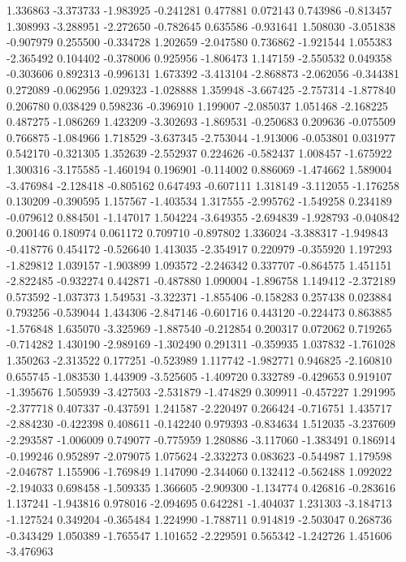 1.336863
-3.373733
-1.983925
-0.241281
0.477881
0.072143
0.743986
-0.813457
1.308993
-3.288951
-2.272650
-0.782645
0.635586
-0.931641
1.508030
-3.051838
-0.907979
0.255500
-0.334728
1.202659
-2.047580
0.736862
-1.921544
1.055383
-2.365492
0.104402
-0.378006
0.925956
-1.806473
1.147159
-2.550532
0.049358
-0.303606
0.892313
-0.996131
1.673392
-3.413104
-2.868873
-2.062056
-0.344381
0.272089
-0.062956
1.029323
-1.028888
1.359948
-3.667425
-2.757314
-1.877840
0.206780
0.038429
0.598236
-0.396910
1.199007
-2.085037
1.051468
-2.168225
0.487275
-1.086269
1.423209
-3.302693
-1.869531
-0.250683
0.209636
-0.075509
0.766875
-1.084966
1.718529
-3.637345
-2.753044
-1.913006
-0.053801
0.031977
0.542170
-0.321305
1.352639
-2.552937
0.224626
-0.582437
1.008457
-1.675922
1.300316
-3.175585
-1.460194
0.196901
-0.114002
0.886069
-1.474662
1.589004
-3.476984
-2.128418
-0.805162
0.647493
-0.607111
1.318149
-3.112055
-1.176258
0.130209
-0.390595
1.157567
-1.403534
1.317555
-2.995762
-1.549258
0.234189
-0.079612
0.884501
-1.147017
1.504224
-3.649355
-2.694839
-1.928793
-0.040842
0.200146
0.180974
0.061172
0.709710
-0.897802
1.336024
-3.388317
-1.949843
-0.418776
0.454172
-0.526640
1.413035
-2.354917
0.220979
-0.355920
1.197293
-1.829812
1.039157
-1.903899
1.093572
-2.246342
0.337707
-0.864575
1.451151
-2.822485
-0.932274
0.442871
-0.487880
1.090004
-1.896758
1.149412
-2.372189
0.573592
-1.037373
1.549531
-3.322371
-1.855406
-0.158283
0.257438
0.023884
0.793256
-0.539044
1.434306
-2.847146
-0.601716
0.443120
-0.224473
0.863885
-1.576848
1.635070
-3.325969
-1.887540
-0.212854
0.200317
0.072062
0.719265
-0.714282
1.430190
-2.989169
-1.302490
0.291311
-0.359935
1.037832
-1.761028
1.350263
-2.313522
0.177251
-0.523989
1.117742
-1.982771
0.946825
-2.160810
0.655745
-1.083530
1.443909
-3.525605
-1.409720
0.332789
-0.429653
0.919107
-1.395676
1.505939
-3.427503
-2.531879
-1.474829
0.309911
-0.457227
1.291995
-2.377718
0.407337
-0.437591
1.241587
-2.220497
0.266424
-0.716751
1.435717
-2.884230
-0.422398
0.408611
-0.142240
0.979393
-0.834634
1.512035
-3.237609
-2.293587
-1.006009
0.749077
-0.775959
1.280886
-3.117060
-1.383491
0.186914
-0.199246
0.952897
-2.079075
1.075624
-2.332273
0.083623
-0.544987
1.179598
-2.046787
1.155906
-1.769849
1.147090
-2.344060
0.132412
-0.562488
1.092022
-2.194033
0.698458
-1.509335
1.366605
-2.909300
-1.134774
0.426816
-0.283616
1.137241
-1.943816
0.978016
-2.094695
0.642281
-1.404037
1.231303
-3.184713
-1.127524
0.349204
-0.365484
1.224990
-1.788711
0.914819
-2.503047
0.268736
-0.343429
1.050389
-1.765547
1.101652
-2.229591
0.565342
-1.242726
1.451606
-3.476963
